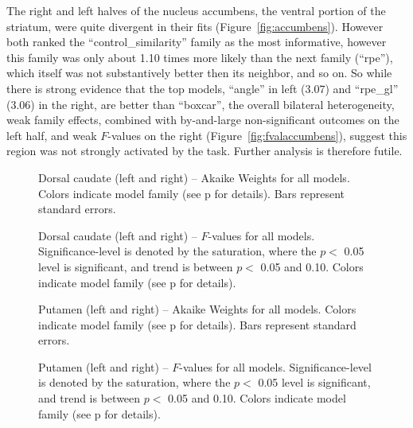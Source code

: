 \documentclass[doc,12pt]{apa}        %
\begin{document}
The right and left halves of the nucleus accumbens, the ventral portion of the striatum, were quite divergent in their fits (Figure~\ref{fig:accumbens}).  However both ranked the ``control\_similarity'' family as the most informative, however this family was only about 1.10 times more likely than the next family (``rpe''), which itself was not substantively better then its neighbor, and so on.  So while there is strong evidence that the top models, ``angle'' in left (3.07) and ``rpe\_gl'' (3.06) in the right, are better than ``boxcar'', the overall bilateral heterogeneity, weak family effects, combined with by-and-large non-significant outcomes on the left half, and weak $F$-values on the right (Figure~\ref{fig:fvalaccumbens}), suggest this region was not strongly activated by the task.  Further analysis is therefore futile.

\begin{figure}[tp]
    \centering
    \caption{Dorsal caudate (left and right) -- Akaike Weights for all models.  Colors indicate model family (see p\pageref{sub:cmb} for details). Bars represent standard errors.}
	\label{fig:caudate}
\end{figure}
\begin{figure}[tp]
    \centering
    \caption{Dorsal caudate (left and right) -- $F$-values for all models.  Significance-level is denoted by the saturation, where the $p <$ 0.05 level is significant, and trend is between $p <$ 0.05 and 0.10.  Colors indicate model family (see p\pageref{sub:cmb} for details).}
	\label{fig:fvalcaudate}
\end{figure}

\begin{figure}[tp]
    \centering
    \caption{Putamen (left and right) -- Akaike Weights for all models.  Colors indicate model family (see p\pageref{sub:cmb} for details). Bars represent standard errors.}
	\label{fig:putamen}
\end{figure}
\begin{figure}[tp]
    \centering
    \caption{Putamen (left and right) -- $F$-values for all models.
    Significance-level is denoted by the saturation, where the $p <$ 0.05 level is
    significant, and trend is between $p <$ 0.05 and 0.10.  Colors indicate model family (see p\pageref{sub:cmb} for details).}
	\label{fig:fvalputamen}
\end{figure}
\end{document}
